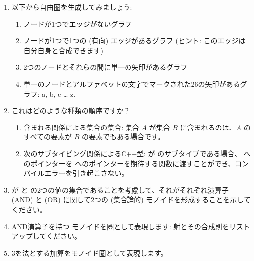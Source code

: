 \begin{enumerate}
  \tightlist
  \item
        以下から自由圏を生成してみましょう: 

        \begin{enumerate}
          \tightlist
          \item
                ノードが1つでエッジがないグラフ
          \item
                ノードが1つで1つの (有向) エッジがあるグラフ (ヒント: このエッジは自分自身と合成できます) 
          \item
                2つのノードとそれらの間に単一の矢印があるグラフ
          \item
                単一のノードとアルファベットの文字でマークされた26の矢印があるグラフ: a, b, c \ldots{} z.
        \end{enumerate}
  \item
        これはどのような種類の順序ですか？

        \begin{enumerate}
          \tightlist
          \item
                含まれる関係による集合の集合: 集合 \(A\) が集合 \(B\) に含まれるのは、\(A\) のすべての要素が \(B\) の要素でもある場合です。
          \item
                次のサブタイピング関係によるC++型:  が  のサブタイプである場合、 へのポインターを  へのポインターを期待する関数に渡すことができ、コンパイルエラーを引き起こさない。
        \end{enumerate}
  \item
         が  と  の2つの値の集合であることを考慮して、それがそれぞれ演算子 \code{\&\&} (AND) と \code{||} (OR) に関して2つの (集合論的) モノイドを形成することを示してください。
  \item
        AND演算子を持つ  モノイドを圏として表現します: 射とその合成則をリストアップしてください。
  \item
        3を法とする加算をモノイド圏として表現します。
\end{enumerate}

